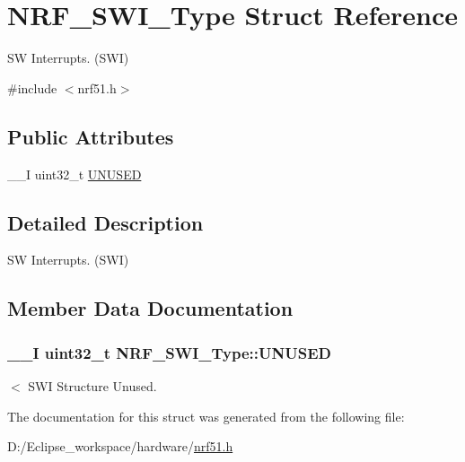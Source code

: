 \hypertarget{struct_n_r_f___s_w_i___type}{}\section{N\+R\+F\+\_\+\+S\+W\+I\+\_\+\+Type Struct Reference}
\label{struct_n_r_f___s_w_i___type}


S\+W Interrupts. (S\+W\+I)  




{\ttfamily \#include $<$nrf51.\+h$>$}

\subsection*{Public Attributes}
\begin{DoxyCompactItemize}
\item 
\+\_\+\+\_\+\+I uint32\+\_\+t \hyperlink{struct_n_r_f___s_w_i___type_a0da3ccf3e8268623908cfe11f0ba9d45}{U\+N\+U\+S\+E\+D}
\end{DoxyCompactItemize}


\subsection{Detailed Description}
S\+W Interrupts. (S\+W\+I) 

\subsection{Member Data Documentation}
\hypertarget{struct_n_r_f___s_w_i___type_a0da3ccf3e8268623908cfe11f0ba9d45}{}
\subsubsection[{U\+N\+U\+S\+E\+D}]{\setlength{\rightskip}{0pt plus 5cm}\+\_\+\+\_\+\+I uint32\+\_\+t N\+R\+F\+\_\+\+S\+W\+I\+\_\+\+Type\+::\+U\+N\+U\+S\+E\+D}\label{struct_n_r_f___s_w_i___type_a0da3ccf3e8268623908cfe11f0ba9d45}
$<$ S\+W\+I Structure Unused. 

The documentation for this struct was generated from the following file\+:\begin{DoxyCompactItemize}
\item 
D\+:/\+Eclipse\+\_\+workspace/hardware/\hyperlink{nrf51_8h}{nrf51.\+h}\end{DoxyCompactItemize}
